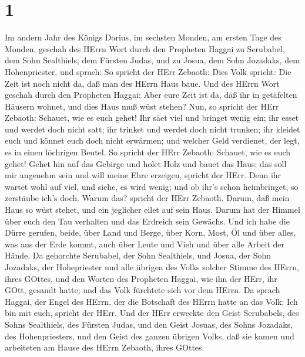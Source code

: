 \hypertarget{section}{%
\section{1}\label{section}}

 Im andern Jahr des Königs Darius, im sechsten Monden, am
ersten Tage des Monden, geschah des HErrn Wort durch den Propheten
Haggai zu Serubabel, dem Sohn Sealthiels, dem Fürsten Judas, und zu
Josua, dem Sohn Jozadaks, dem Hohenpriester, und sprach:  So
spricht der HErr Zebaoth: Dies Volk spricht: Die Zeit ist noch nicht da,
daß man des HErrn Haus baue.  Und des HErrn Wort geschah
durch den Propheten Haggai:  Aber eure Zeit ist da, daß ihr
in getäfelten Häusern wohnet, und dies Haus muß wüst stehen?
 Nun, so spricht der HErr Zebaoth: Schauet, wie es euch
gehet!  Ihr säet viel und bringet wenig ein; ihr esset und
werdet doch nicht satt; ihr trinket und werdet doch nicht trunken; ihr
kleidet euch und könnet euch doch nicht erwärmen; und welcher Geld
verdienet, der legt, es in einen löchrigen Beutel.  So
spricht der HErr Zebaoth: Schauet, wie es euch gehet!  Gehet
hin auf das Gebirge und holet Holz und bauet das Haus; das soll mir
angenehm sein und will meine Ehre erzeigen, spricht der HErr.
 Denn ihr wartet wohl auf viel, und siehe, es wird wenig;
und ob ihr's schon heimbringet, so zerstäube ich's doch. Warum das?
spricht der HErr Zebaoth. Darum, daß mein Haus so wüst stehet, und ein
jeglicher eilet auf sein Haus.  Darum hat der Himmel über
euch den Tau verhalten und das Erdreich sein Gewächs.  Und
ich habe die Dürre gerufen, beide, über Land und Berge, über Korn, Most,
Öl und über alles, was aus der Erde kommt, auch über Leute und Vieh und
über alle Arbeit der Hände.  Da gehorchte Serubabel, der
Sohn Sealthiels, und Josua, der Sohn Jozadaks, der Hohepriester und alle
übrigen des Volks solcher Stimme des HErrn, ihres GOttes, und den Worten
des Propheten Haggai, wie ihn der HErr, ihr GOtt, gesandt hatte; und das
Volk fürchtete sich vor dem HErrn.  Da sprach Haggai, der
Engel des HErrn, der die Botschaft des HErrn hatte an das Volk: Ich bin
mit euch, spricht der HErr.  Und der HErr erweckte den
Geist Serubabels, des Sohns Sealthiels, des Fürsten Judas, und den Geist
Josuas, des Sohns Jozadaks, des Hohenpriesters, und den Geist des ganzen
übrigen Volks, daß sie kamen und arbeiteten am Hause des HErrn Zebaoth,
ihres GOttes.

